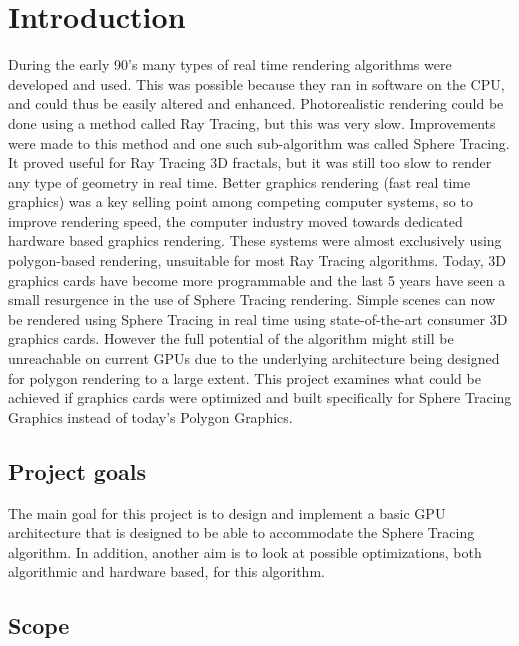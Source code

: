 \chapter{Introduction} 
	

	During the early 90’s many types of real time rendering algorithms were
	developed and used\cite{TODO}. This was possible because they ran in software
	on the CPU, and could thus be easily altered and enhanced. Photorealistic
	rendering could be done using a method called Ray Tracing, but this was very
	slow\cite{TODO}. Improvements were made to this method and one such
	sub-algorithm was called Sphere Tracing. It proved useful for Ray Tracing 3D
	fractals\cite{TODO}, but it was still too slow to render any type of geometry
	in real time\cite{TODO}. Better graphics rendering (fast real time graphics)
	was a key selling point among competing computer systems, so to improve
	rendering speed, the computer industry moved towards dedicated hardware based
	graphics rendering\cite{TODO}. These systems were almost exclusively using
	polygon-based rendering, unsuitable for most Ray Tracing algorithms. Today,
	3D graphics cards have become more programmable and the last 5 years have
	seen a small resurgence in the use of Sphere Tracing rendering\cite{TODO}.
	Simple scenes can now be rendered using Sphere Tracing in real time using
	state-of-the-art consumer 3D graphics cards. However the full potential of
	the algorithm might still be unreachable on current GPUs due to the
	underlying architecture being designed for polygon rendering to a large
	extent\cite{TODO}. This project examines what could be achieved if graphics
	cards were optimized and built specifically for Sphere Tracing Graphics
	instead of today’s Polygon Graphics.		 
	
	\section{Project goals}

		The main goal for this project is to design and implement a basic GPU 
		architecture that is designed to be able to accommodate the Sphere 
		Tracing algorithm. In addition, another aim is to look at possible 
		optimizations, both algorithmic	and hardware based, for this algorithm.
		
	\section{Scope}
		
